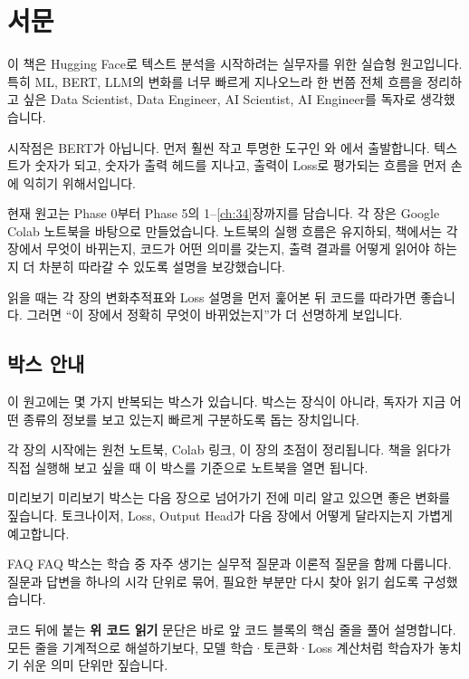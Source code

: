 \chapter*{서문}

이 책은 Hugging Face로 텍스트 분석을 시작하려는 실무자를 위한 실습형 원고입니다. 특히 ML, BERT, LLM의 변화를 너무 빠르게 지나오느라 한 번쯤 전체 흐름을 정리하고 싶은 Data Scientist, Data Engineer, AI Scientist, AI Engineer를 독자로 생각했습니다.

시작점은 BERT가 아닙니다. 먼저 훨씬 작고 투명한 도구인 와 에서 출발합니다. 텍스트가 숫자가 되고, 숫자가 출력 헤드를 지나고, 출력이 Loss로 평가되는 흐름을 먼저 손에 익히기 위해서입니다.

현재 원고는 Phase 0부터 Phase 5의 1--\ref{ch:34}장까지를 담습니다. 각 장은 Google Colab 노트북을 바탕으로 만들었습니다. 노트북의 실행 흐름은 유지하되, 책에서는 각 장에서 무엇이 바뀌는지, 코드가 어떤 의미를 갖는지, 출력 결과를 어떻게 읽어야 하는지 더 차분히 따라갈 수 있도록 설명을 보강했습니다.

읽을 때는 각 장의 변화추적표와 Loss 설명을 먼저 훑어본 뒤 코드를 따라가면 좋습니다. 그러면 “이 장에서 정확히 무엇이 바뀌었는지”가 더 선명하게 보입니다.

\section*{박스 안내}

이 원고에는 몇 가지 반복되는 박스가 있습니다. 박스는 장식이 아니라, 독자가 지금 어떤 종류의 정보를 보고 있는지 빠르게 구분하도록 돕는 장치입니다.

\begin{noteBox}
각 장의 시작에는 원천 노트북, Colab 링크, 이 장의 초점이 정리됩니다. 책을 읽다가 직접 실행해 보고 싶을 때 이 박스를 기준으로 노트북을 열면 됩니다.
\end{noteBox}

\begin{previewBox}{미리보기}
미리보기 박스는 다음 장으로 넘어가기 전에 미리 알고 있으면 좋은 변화를 짚습니다. 토크나이저, Loss, Output Head가 다음 장에서 어떻게 달라지는지 가볍게 예고합니다.
\end{previewBox}

\begin{faqBox}{FAQ}
FAQ 박스는 학습 중 자주 생기는 실무적 질문과 이론적 질문을 함께 다룹니다. 질문과 답변을 하나의 시각 단위로 묶어, 필요한 부분만 다시 찾아 읽기 쉽도록 구성했습니다.
\end{faqBox}

코드 뒤에 붙는 \textbf{위 코드 읽기} 문단은 바로 앞 코드 블록의 핵심 줄을 풀어 설명합니다. 모든 줄을 기계적으로 해설하기보다, 모델 학습·토큰화·Loss 계산처럼 학습자가 놓치기 쉬운 의미 단위만 짚습니다.

\cleardoublepage
